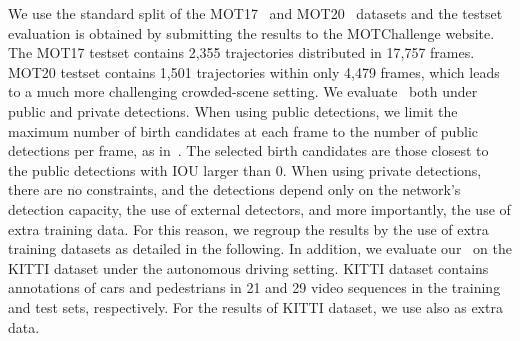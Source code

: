  We use the standard split of the MOT17~\cite{MOT16} and MOT20~\cite{MOTChallenge20} datasets and the testset evaluation is obtained by submitting the results to the MOTChallenge website. The MOT17 testset contains 2,355 trajectories distributed in 17,757 frames. MOT20 testset contains 1,501 trajectories within only 4,479 frames, which leads to a much more challenging crowded-scene setting. We evaluate \method\ both under public and private detections. When using public detections, we limit the maximum number of birth candidates at each frame to the number of public detections per frame, as in~\cite{zhou2020tracking,meinhardt2021trackformer}. The selected birth candidates are those closest to the public detections with IOU larger than 0. When using private detections, there are no constraints, and the detections depend only on the network's detection capacity, the use of external detectors, and more importantly, the use of extra training data. For this reason, we regroup the results by the use of extra training datasets as detailed in the following. In addition, we evaluate our \method\ on the KITTI dataset under the autonomous driving setting. KITTI dataset contains annotations of cars and pedestrians in 21 and 29 video sequences in the training and test sets, respectively. For the results of KITTI dataset, we use also \cite{thomas_pandikow_kim_stanley_grieve_2021} as extra data.\begin{table*}[ht]
    \center
    \tabcolsep=0.11cm
    \caption{Results on MOT20 testset: the table is structured following the same principle as Tab.~\ref{tab:mot17merged}. Methods with * are not associated to a publication. The best result within the same training conditions (background color) is \underline{underlined}. The best result among published methods is in \textbf{bold}. Best seen in color.} \label{tab:mot20merge}
\end{table*}
